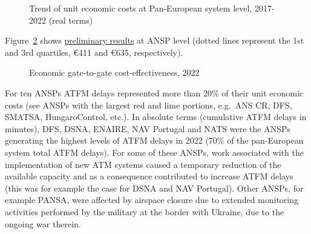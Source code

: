 \documentclass[
  letterpaper,
  DIV=11,
  numbers=noendperiod]{scrreprt}
\begin{document}
\begin{figure}[h]
\begin{minipage}{0.50\linewidth}
{}

\subcaption{\label{fig-figure-3-1-right}~}

\end{minipage}%

\caption{\label{fig-figure-3-1}Trend of unit economic costs at
Pan-European system level, 2017-2022 (real terms)}

\end{figure}%

Figure~\ref{fig-figure-3-2} shows \ul{preliminary results} at ANSP level
(dotted lines represent the 1st and 3rd quartiles, €411 and €635,
respectively).

\begin{figure}[h]


\caption{\label{fig-figure-3-2}Economic gate-to-gate cost-effectiveness,
2022 }

\end{figure}%

\vspace{14cm}

For ten ANSPs ATFM delays represented more than 20\% of their unit
economic costs (see ANSPs with the largest red and lime portions,
e.g.~ANS CR, DFS, SMATSA, HungaroControl, etc.). In absolute terms
(cumulative ATFM delays in minutes), DFS, DSNA, ENAIRE, NAV Portugal and
NATS were the ANSPs generating the highest levels of ATFM delays in 2022
(70\% of the pan-European system total ATFM delays). For some of these
ANSPs, work associated with the implementation of new ATM systems caused
a temporary reduction of the available capacity and as a consequence
contributed to increase ATFM delays (this was for example the case for
DSNA and NAV Portugal). Other ANSPs, for example PANSA, were affected by
airspace closure due to extended monitoring activities performed by the
military at the border with Ukraine, due to the ongoing war therein.
\end{document}
